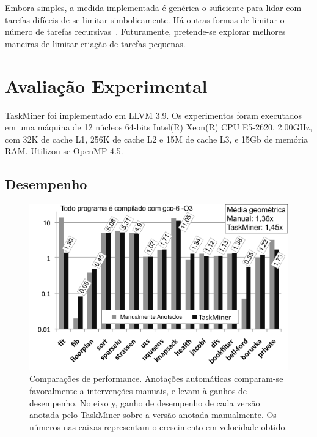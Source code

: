 \documentclass[sigplan,10pt]{acmart}
\newcommand\Taskminer{\mbox{\textsf{TaskMiner}}}
\begin{document}
Embora simples, a medida implementada é genérica o suficiente para lidar com 
tarefas difíceis de se
limitar simbolicamente. 
Há outras formas de limitar o número de tarefas recursivas~\cite{Iwasaki16}.
Futuramente, 
pretende-se explorar melhores maneiras de
limitar criação de tarefas pequenas.

\section{Avalia\c{c}\~{a}o Experimental}
\label{sec:eval}

{\Taskminer} foi implementado em LLVM 3.9. Os experimentos
foram executados em uma máquina de 12 núcleos 64-bits Intel(R) Xeon(R) CPU E5-2620, 2.00GHz, com 32K de cache L1, 256K de cache L2 e 15M de cache L3, e 15Gb de memória RAM. Utilizou-se OpenMP 4.5.

\subsection{Desempenho}
\label{sub:performance}

\begin{figure}[b!]
\begin{center}
\includegraphics[width=1\columnwidth]{images/TM_Performance}
\caption{Comparações de performance. Anotações automáticas comparam-se favoralmente a intervenções
manuais, e levam à ganhos de desempenho. No eixo y, ganho de desempenho de cada versão anotada
pelo {\Taskminer} sobre a versão anotada manualmente. Os números nas caixas representam
o crescimento em velocidade obtido.}
\label{fig:TM_Performance}
\end{center}
\end{figure}
\end{document}
